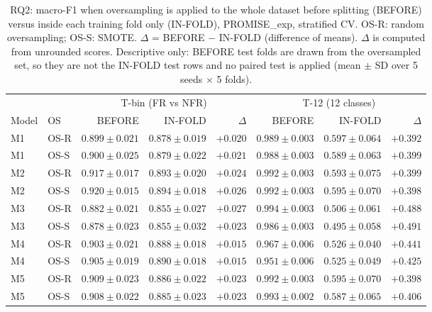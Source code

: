 \begin{table}[t]
\centering
\caption{RQ2: macro-F1 when oversampling is applied to the whole dataset before splitting (BEFORE) versus inside each training fold only (IN-FOLD), PROMISE\_exp, stratified CV. OS-R: random oversampling; OS-S: SMOTE. $\Delta$ = BEFORE $-$ IN-FOLD (difference of means). $\Delta$ is computed from unrounded scores. Descriptive only: BEFORE test folds are drawn from the oversampled set, so they are not the IN-FOLD test rows and no paired test is applied (mean $\pm$ SD over 5 seeds $\times$ 5 folds).}
\label{tab:rq2}
\small
\setlength{\tabcolsep}{4pt}
\begin{tabular}{llrrrrrr}
\toprule
& & \multicolumn{3}{c}{T-bin (FR vs NFR)} & \multicolumn{3}{c}{T-12 (12 classes)} \\
\cmidrule(lr){3-5}\cmidrule(lr){6-8}
Model & OS & BEFORE & IN-FOLD & $\Delta$ & BEFORE & IN-FOLD & $\Delta$ \\
\midrule
M1 & OS-R & $0.899 \pm 0.021$ & $0.878 \pm 0.019$ & $+0.020$ & $0.989 \pm 0.003$ & $0.597 \pm 0.064$ & $+0.392$ \\
M1 & OS-S & $0.900 \pm 0.025$ & $0.879 \pm 0.022$ & $+0.021$ & $0.988 \pm 0.003$ & $0.589 \pm 0.063$ & $+0.399$ \\
M2 & OS-R & $0.917 \pm 0.017$ & $0.893 \pm 0.020$ & $+0.024$ & $0.992 \pm 0.003$ & $0.593 \pm 0.075$ & $+0.399$ \\
M2 & OS-S & $0.920 \pm 0.015$ & $0.894 \pm 0.018$ & $+0.026$ & $0.992 \pm 0.003$ & $0.595 \pm 0.070$ & $+0.398$ \\
M3 & OS-R & $0.882 \pm 0.021$ & $0.855 \pm 0.027$ & $+0.027$ & $0.994 \pm 0.003$ & $0.506 \pm 0.061$ & $+0.488$ \\
M3 & OS-S & $0.878 \pm 0.023$ & $0.855 \pm 0.032$ & $+0.023$ & $0.986 \pm 0.003$ & $0.495 \pm 0.058$ & $+0.491$ \\
M4 & OS-R & $0.903 \pm 0.021$ & $0.888 \pm 0.018$ & $+0.015$ & $0.967 \pm 0.006$ & $0.526 \pm 0.040$ & $+0.441$ \\
M4 & OS-S & $0.905 \pm 0.019$ & $0.890 \pm 0.018$ & $+0.015$ & $0.951 \pm 0.006$ & $0.525 \pm 0.049$ & $+0.425$ \\
M5 & OS-R & $0.909 \pm 0.023$ & $0.886 \pm 0.022$ & $+0.023$ & $0.992 \pm 0.003$ & $0.595 \pm 0.070$ & $+0.398$ \\
M5 & OS-S & $0.908 \pm 0.022$ & $0.885 \pm 0.023$ & $+0.023$ & $0.993 \pm 0.002$ & $0.587 \pm 0.065$ & $+0.406$ \\
\bottomrule
\end{tabular}
\end{table}
